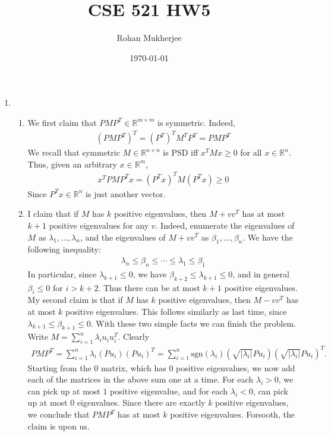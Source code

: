 \documentclass[12pt]{article}
\title{CSE 521 HW5}
\date{\today}
\author{Rohan Mukherjee}
\theoremstyle{definitionstyle}
\def\mbb#1{\mathbb{#1}}
\def \R{\mbb{R}}
\begin{document}
	\maketitle
	\begin{enumerate}[leftmargin=\labelsep]
		\item \begin{enumerate}
			\item We first claim that $P M P^T \in \R^{m \times m}$ is symmetric. Indeed,
			\begin{align*}
				(PMP^T)^T = (P^T)^T M^T P^T = P M P^T
			\end{align*}
			We recall that symmetric $M \in \R^{n \times n}$ is PSD iff $x^T M x \geq 0$ for all $x \in \R^n$. Thus, given an arbitrary $x \in \R^m$,
			\begin{align*}
				x^T PMP^T x = (P^Tx)^T M (P^Tx) \geq 0
			\end{align*}
			Since $P^Tx \in \R^n$ is just another vector.
			
			\item I claim that if $M$ has $k$ positive eigenvalues, then $M + vv^T$ has at most $k + 1$ positive eigenvalues for any $v$. Indeed, enumerate the eigenvalues of $M$ as $\lambda_1, \ldots, \lambda_n$, and the eigenvalues of $M + vv^T$ as $\beta_1, \ldots, \beta_n$. We have the following inequality:
			\begin{align*}
				\lambda_n \leq \beta_n \leq \cdots \leq \lambda_1 \leq \beta_1
			\end{align*}
			In particular, since $\lambda_{k+1} \leq 0$, we have $\beta_{k+2} \leq \lambda_{k+1} \leq 0$, and in general $\beta_{i} \leq 0$ for $i > k + 2$. Thus there can be at most $k + 1$ positive eigenvalues. My second claim is that if $M$ has $k$ positive eigenvalues, then $M - vv^T$ has at most $k$ positive eigenvalues. This follows similarly as last time, since $\lambda_{k+1} \leq \beta_{k+1} \leq 0$. With these two simple facts we can finish the problem. Write $M = \sum_{i=1}^n \lambda_i u_iu_i^T$. Clearly \begin{align*}
				PMP^T = \sum_{i=1}^n \lambda_i (Pu_i)(Pu_i)^T = \sum_{i=1}^n \mathrm{sgn}(\lambda_i)(\sqrt{|\lambda_i|}Pu_i)(\sqrt{|\lambda_i|}Pu_i)^T.
			\end{align*}
			Starting from the 0 matrix, which has 0 positive eigenvalues, we now add each of the matrices in the above sum one at a time. For each $\lambda_i > 0$, we can pick up at most $1$ positive eigenvalue, and for each $\lambda_i < 0$, can pick up at most 0 eigenvalues. Since there are exactly $k$ positive eigenvalues, we conclude that $PMP^T$ has at most $k$ positive eigenvalues. Forsooth, the claim is upon us.
			\end{enumerate}
		

\end{enumerate}
\end{document}
